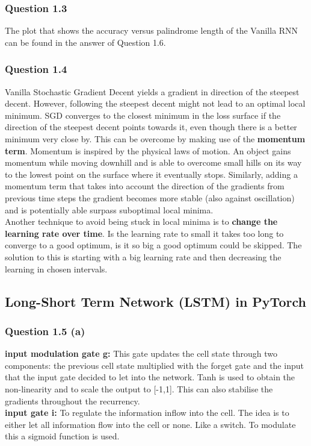 \documentclass{article}
\begin{document}
\subsubsection*{Question 1.3}
The plot that shows the accuracy versus palindrome length of the Vanilla RNN can be found in the answer of Question 1.6.
\subsubsection*{Question 1.4}
Vanilla Stochastic Gradient Decent yields a gradient in direction of the steepest decent. However, following the steepest decent might not lead to an optimal local minimum. SGD converges to the closest minimum in the loss surface if the direction of the steepest decent points towards it, even though there is a better minimum very close by. This can be overcome by making use of the \textbf{momentum term}. Momentum is inspired by the physical laws of motion. An object gains momentum while moving downhill and is able to overcome small hills on its way to the lowest point on the surface where it eventually stops. Similarly, adding a momentum term  that takes into account the direction of the gradients from previous time steps the gradient becomes more stable (also against oscillation) and is potentially able surpass suboptimal local minima. \\
Another technique to avoid being stuck in local minima is to \textbf{change the learning rate over time}. Is the learning rate to small it takes too long to converge to a good optimum, is it so big a good optimum could be skipped. The solution to this is starting with a big learning rate and then decreasing the learning in chosen intervals. 
\subsection*{Long-Short Term Network (LSTM) in PyTorch}
\subsubsection*{Question 1.5 (a)}
\textbf{input modulation gate g:}  This gate updates the cell state through two components: the previous cell state multiplied with the forget gate and the input that the input gate decided to let into the network. Tanh is used to obtain the non-linearity and to scale the output to [-1,1]. This can also stabilise the gradients throughout the recurrency.  \\

\textbf{input gate i:} To regulate the information inflow into the cell. The idea is to either let all information flow into the cell or none. Like a switch. To modulate this a sigmoid function is used. \\
\end{document}

